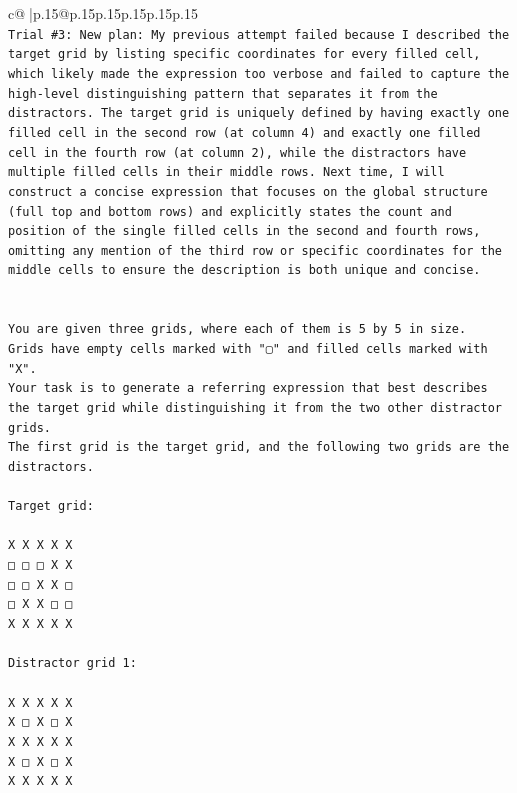 \documentclass{article}
\begin{document}
{\begin{supertabular}{c@{$\;$}|p{.15\linewidth}@{}p{.15\linewidth}p{.15\linewidth}p{.15\linewidth}p{.15\linewidth}p{.15\linewidth}}
{{{\\ 
\texttt{Trial \#3: New plan: My previous attempt failed because I described the target grid by listing specific coordinates for every filled cell, which likely made the expression too verbose and failed to capture the high{-}level distinguishing pattern that separates it from the distractors. The target grid is uniquely defined by having exactly one filled cell in the second row (at column 4) and exactly one filled cell in the fourth row (at column 2), while the distractors have multiple filled cells in their middle rows. Next time, I will construct a concise expression that focuses on the global structure (full top and bottom rows) and explicitly states the count and position of the single filled cells in the second and fourth rows, omitting any mention of the third row or specific coordinates for the middle cells to ensure the description is both unique and concise.} \\
\\ 
\\ 
\texttt{You are given three grids, where each of them is 5 by 5 in size.} \\
\texttt{Grids have empty cells marked with "▢" and filled cells marked with "X".} \\
\texttt{Your task is to generate a referring expression that best describes the target grid while distinguishing it from the two other distractor grids.} \\
\texttt{The first grid is the target grid, and the following two grids are the distractors.} \\
\\ 
\texttt{Target grid:} \\
\\ 
\texttt{X X X X X} \\
\texttt{□ □ □ X X} \\
\texttt{□ □ X X □} \\
\texttt{□ X X □ □} \\
\texttt{X X X X X} \\
\\ 
\texttt{Distractor grid 1:} \\
\\ 
\texttt{X X X X X} \\
\texttt{X □ X □ X} \\
\texttt{X X X X X} \\
\texttt{X □ X □ X} \\
\texttt{X X X X X} \\
\\ 
}}}
\end{supertabular}}
\end{document}
